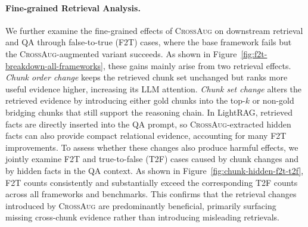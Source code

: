 \documentclass[11pt]{article}
\newcommand{\ours}{\textsc{CrossAug}\xspace}
\begin{document}
\paragraph{Fine-grained Retrieval Analysis.}

We further examine the fine-grained effects of \ours on downstream retrieval and QA through false-to-true (F2T) cases, where the base framework fails but the \ours-augmented variant succeeds. As shown in Figure~\ref{fig:f2t-breakdown-all-frameworks}, these gains mainly arise from two retrieval effects. \emph{Chunk order change} keeps the retrieved chunk set unchanged but ranks more useful evidence higher, increasing its LLM attention. \emph{Chunk set change} alters the retrieved evidence by introducing either gold chunks into the top-$k$ or non-gold bridging chunks that still support the reasoning chain. In LightRAG, retrieved facts are directly inserted into the QA prompt, so \ours-extracted hidden facts can also provide compact relational evidence, accounting for many F2T improvements.
To assess whether these changes also produce harmful effects, we jointly examine F2T and true-to-false (T2F) cases caused by chunk changes and by hidden facts in the QA context. As shown in Figure~\ref{fig:chunk-hidden-f2t-t2f}, F2T counts consistently and substantially exceed the corresponding T2F counts across all frameworks and benchmarks. This confirms that the retrieval changes introduced by \ours are predominantly beneficial, primarily surfacing missing cross-chunk evidence rather than introducing misleading retrievals.

\end{document}
